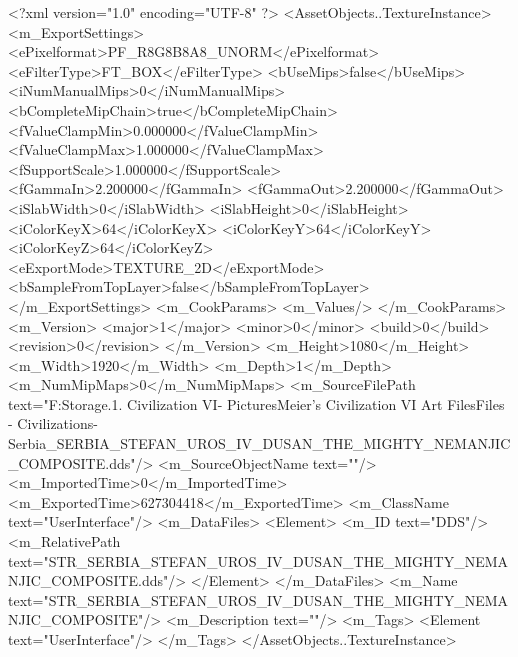 <?xml version="1.0" encoding="UTF-8" ?>
<AssetObjects..TextureInstance>
	<m_ExportSettings>
		<ePixelformat>PF_R8G8B8A8_UNORM</ePixelformat>
		<eFilterType>FT_BOX</eFilterType>
		<bUseMips>false</bUseMips>
		<iNumManualMips>0</iNumManualMips>
		<bCompleteMipChain>true</bCompleteMipChain>
		<fValueClampMin>0.000000</fValueClampMin>
		<fValueClampMax>1.000000</fValueClampMax>
		<fSupportScale>1.000000</fSupportScale>
		<fGammaIn>2.200000</fGammaIn>
		<fGammaOut>2.200000</fGammaOut>
		<iSlabWidth>0</iSlabWidth>
		<iSlabHeight>0</iSlabHeight>
		<iColorKeyX>64</iColorKeyX>
		<iColorKeyY>64</iColorKeyY>
		<iColorKeyZ>64</iColorKeyZ>
		<eExportMode>TEXTURE_2D</eExportMode>
		<bSampleFromTopLayer>false</bSampleFromTopLayer>
	</m_ExportSettings>
	<m_CookParams>
		<m_Values/>
	</m_CookParams>
	<m_Version>
		<major>1</major>
		<minor>0</minor>
		<build>0</build>
		<revision>0</revision>
	</m_Version>
	<m_Height>1080</m_Height>
	<m_Width>1920</m_Width>
	<m_Depth>1</m_Depth>
	<m_NumMipMaps>0</m_NumMipMaps>
	<m_SourceFilePath text="F:\Mod Storage\2.1. Civilization VI\Mods\Archive - Pictures\Sid Meier's Civilization VI Art Files\Art Files - Civilizations\Civilization - Serbia\STR_SERBIA_STEFAN_UROS_IV_DUSAN_THE_MIGHTY_NEMANJIC_COMPOSITE.dds"/>
	<m_SourceObjectName text=""/>
	<m_ImportedTime>0</m_ImportedTime>
	<m_ExportedTime>627304418</m_ExportedTime>
	<m_ClassName text="UserInterface"/>
	<m_DataFiles>
		<Element>
			<m_ID text="DDS"/>
			<m_RelativePath text="STR_SERBIA_STEFAN_UROS_IV_DUSAN_THE_MIGHTY_NEMANJIC_COMPOSITE.dds"/>
		</Element>
	</m_DataFiles>
	<m_Name text="STR_SERBIA_STEFAN_UROS_IV_DUSAN_THE_MIGHTY_NEMANJIC_COMPOSITE"/>
	<m_Description text=""/>
	<m_Tags>
		<Element text="UserInterface"/>
	</m_Tags>
</AssetObjects..TextureInstance>

